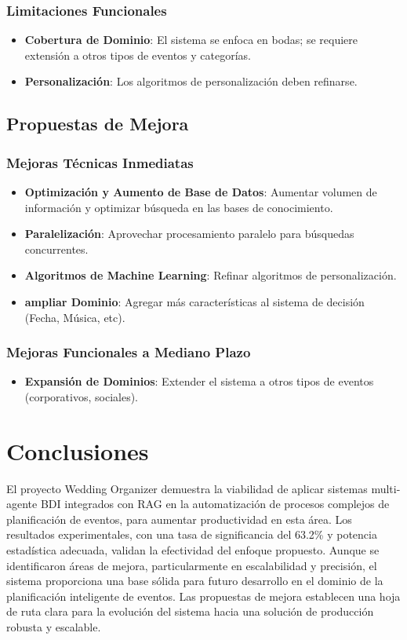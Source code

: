 \documentclass[runningheads,a4paper]{llncs}
\begin{document}
\subsubsection{Limitaciones Funcionales}
\begin{itemize}
    \item \textbf{Cobertura de Dominio}: El sistema se enfoca en bodas; se requiere extensión a otros tipos de eventos y 
    categorías.
    \item \textbf{Personalización}: Los algoritmos de personalización deben refinarse.
\end{itemize}

\subsection{Propuestas de Mejora}

\subsubsection{Mejoras Técnicas Inmediatas}
\begin{itemize}
    \item \textbf{Optimización y Aumento de Base de Datos}: Aumentar volumen  de información y optimizar búsqueda en las 
    bases de conocimiento.
    \item \textbf{Paralelización}: Aprovechar procesamiento paralelo para búsquedas concurrentes.
    \item \textbf{Algoritmos de Machine Learning}: Refinar algoritmos de personalización.
    \item \textbf{ampliar Dominio}: Agregar más características al sistema de decisión (Fecha, Música, etc).
\end{itemize}

\subsubsection{Mejoras Funcionales a Mediano Plazo}
\begin{itemize}
    \item \textbf{Expansión de Dominios}: Extender el sistema a otros tipos de eventos (corporativos, sociales).
\end{itemize}


\section{Conclusiones}

El proyecto Wedding Organizer demuestra la viabilidad de aplicar sistemas multi-agente BDI integrados con RAG en la automatización de procesos complejos de planificación de eventos, para aumentar productividad en esta área. Los resultados experimentales, con una tasa de significancia del 63.2\% y potencia estadística adecuada, validan la efectividad del enfoque propuesto.
Aunque se identificaron áreas de mejora, particularmente en escalabilidad y precisión, el sistema proporciona una base sólida para futuro desarrollo en el dominio de la planificación inteligente de eventos. Las propuestas de mejora establecen una hoja de ruta clara para la evolución del sistema hacia una solución de producción robusta y escalable.
\end{document}
